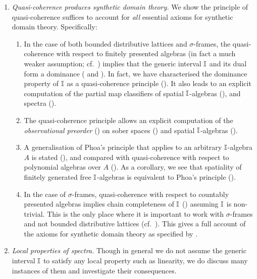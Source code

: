 \begin{enumerate}[leftmargin=*]
  \item \emph{Quasi-coherence produces synthetic domain theory.} We show the principle of quasi-coherence suffices to account for \emph{all} essential axioms for synthetic domain theory. Specifically:
  \begin{enumerate}
    \item\label{contribution:dominance} In the case of both bounded distributive lattices and $\sigma$-frames, the quasi-coherence with respect to finitely presented algebras (in fact a much weaker assumption; cf.\ ) implies that the generic interval $\mathbb{I}$ and its dual form a dominance ( and ). In fact, we have characterised the dominance property of $\mathbb{I}$ as a quasi-coherence principle (). It also leads to an explicit computation of the partial map classifiers of spatial $\mathbb{I}$-algebras (), and spectra ().
    \item The quasi-coherence principle allows an explicit computation of the \emph{observational preorder} () on sober spaces () and spatial $\mathbb{I}$-algebras ().
    \item A generalisation of Phoa's principle that applies to an arbitrary $\mathbb{I}$-algebra $A$ is stated (), and compared with quasi-coherence with respect to polynomial algebras over $A$ (). As a corollary, we see that spatiality of finitely generated free $\mathbb{I}$-algebras is equivalent to Phoa's principle ().
    \item In the case of $\sigma$-frames, quasi-coherence with respect to countably presented algebras implies chain completeness of $\mathbb{I}$ () assuming $\mathbb{I}$ is non-trivial. 
    This is the only place where it is important to work with $\sigma$-frames and not bounded distributive lattices (cf.~). This gives a full account of the axioms for synthetic domain theory as specified by \citet{hyland1990first}. 
  \end{enumerate}

  \item \emph{Local properties of spectra.} Though in general we do not assume the generic interval $\mathbb{I}$ to satisfy any local property such as linearity, we do discuss many instances of them and investigate their consequences.
  \begin{enumerate}


\end{enumerate}
\end{enumerate}
